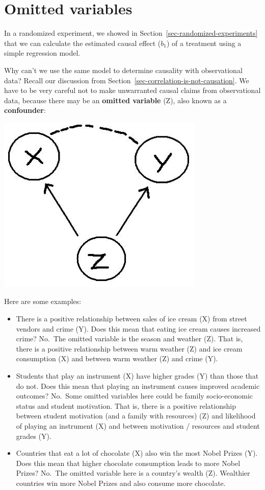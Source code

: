 \documentclass[
  letterpaper,
  DIV=11,
  numbers=noendperiod]{scrreprt}
\providecommand{\tightlist}{%
  \setlength{\itemsep}{0pt}\setlength{\parskip}{0pt}}\usepackage{longtable,booktabs,array}
\theoremstyle{definition}
\theoremstyle{remark}
\begin{document}
\hypertarget{sec-omitted-variables}{%
\section{Omitted variables}\label{sec-omitted-variables}}

In a randomized experiment, we showed in
Section~\ref{sec-randomized-experiments} that we can calculate the
estimated causal effect (\(b_1\)) of a treatment using a simple
regression model.

Why can't we use the same model to determine causality with
observational data? Recall our discussion from
Section~\ref{sec-correlation-is-not-causation}. We have to be very
careful not to make unwarranted causal claims from observational data,
because there may be an \textbf{omitted variable} (Z), also known as a
\textbf{confounder}:

\includegraphics{images/confounder.png}

Here are some examples:

\begin{itemize}
\tightlist
\item
  There is a positive relationship between sales of ice cream (X) from
  street vendors and crime (Y). Does this mean that eating ice cream
  causes increased crime? No.~The omitted variable is the season and
  weather (Z). That is, there is a positive relationship between warm
  weather (Z) and ice cream consumption (X) and between warm weather (Z)
  and crime (Y).
\item
  Students that play an instrument (X) have higher grades (Y) than those
  that do not. Does this mean that playing an instrument causes improved
  academic outcomes? No.~Some omitted variables here could be family
  socio-economic status and student motivation. That is, there is a
  positive relationship between student motivation (and a family with
  resources) (Z) and likelihood of playing an instrument (X) and between
  motivation / resources and student grades (Y).
\item
  Countries that eat a lot of chocolate (X) also win the most Nobel
  Prizes (Y). Does this mean that higher chocolate consumption leads to
  more Nobel Prizes? No.~The omitted variable here is a country's wealth
  (Z). Wealthier countries win more Nobel Prizes and also consume more
  chocolate.
\end{itemize}
\end{document}
